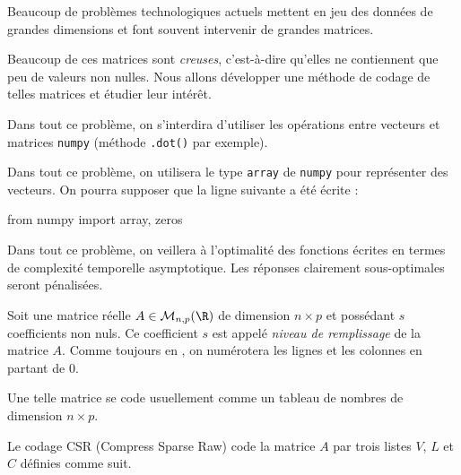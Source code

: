 Beaucoup de problèmes technologiques actuels mettent en jeu des données de grandes dimensions et font souvent intervenir de grandes matrices.

Beaucoup de ces matrices sont \emph{creuses}, c'est-à-dire qu'elles ne contiennent que peu de valeurs non nulles. Nous allons développer une méthode de codage de telles matrices et étudier leur intérêt. 

Dans tout ce problème, on s'interdira d'utiliser les opérations entre vecteurs et matrices \texttt{numpy} (méthode \texttt{.dot()} par exemple). 

Dans tout ce problème, on utilisera le type \texttt{array} de \texttt{numpy} pour représenter des vecteurs. 
On pourra supposer que la ligne suivante a été écrite : 
\begin{pyverbatim}
from numpy import array, zeros
\end{pyverbatim}

Dans tout ce problème, on veillera à l'optimalité des fonctions écrites en termes de complexité temporelle asymptotique. Les réponses clairement sous-optimales seront pénalisées. 

\bigskip{}

Soit une matrice réelle $A \in \mathcal{M}_{n,p}(\R)$ de dimension $n \times p$ et possédant $s$ coefficients non nuls. Ce coefficient $s$ est appelé \emph{niveau de remplissage} de la matrice $A$. 
Comme toujours en \python{}, on numérotera les lignes et les colonnes en partant de $0$. 

Une telle matrice se code usuellement comme un tableau de nombres de dimension $n\times p$. 

Le codage CSR (Compress Sparse Raw) code la matrice $A$ par trois listes $V$, $L$ et $C$ définies comme suit.

